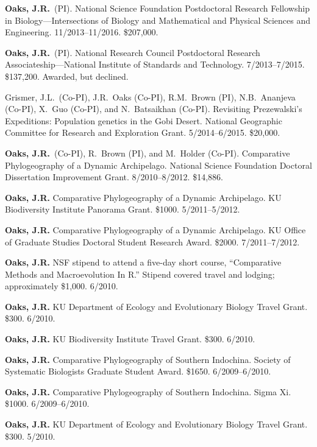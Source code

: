 \myHangIndent
\textbf{Oaks, J.R.}\ (PI).
National Science Foundation Postdoctoral Research Fellowship in
Biology---Intersections of Biology and Mathematical and Physical Sciences and
Engineering.
11/2013--11/2016.
\$207,000.

\myHangIndent
\textbf{Oaks, J.R.}\ (PI).
National Research Council Postdoctoral Research Associateship---National
Institute of Standards and Technology.
7/2013--7/2015.
\$137,200.
Awarded, but declined.

\myHangIndent
Grismer, J.L.\ (Co-PI), J.R.\ Oaks (Co-PI), R.M.\ Brown (PI), N.B.\ Ananjeva
(Co-PI), X.\ Guo (Co-PI), and N.\ Batsaikhan (Co-PI).
Revisiting Prezewalski's Expeditions: Population genetics in the Gobi Desert.
National Geographic Committee for Research and Exploration Grant.
5/2014--6/2015.
\$20,000.

\myHangIndent
\textbf{Oaks, J.R.}\ (Co-PI), R.\ Brown (PI), and M.\ Holder (Co-PI).
Comparative Phylogeography of a Dynamic Archipelago.
National Science Foundation Doctoral Dissertation Improvement Grant.
8/2010--8/2012.
\$14,886.

\myHangIndent
\textbf{Oaks, J.R.}
Comparative Phylogeography of a Dynamic Archipelago.
KU Biodiversity Institute Panorama Grant.
\$1000.
5/2011--5/2012.

\myHangIndent
\textbf{Oaks, J.R.}
Comparative Phylogeography of a Dynamic Archipelago.
KU Office of Graduate Studies Doctoral Student Research Award.
\$2000.
7/2011--7/2012.

\myHangIndent
\textbf{Oaks, J.R.}
NSF stipend to attend a five-day short course, ``Comparative Methods and
Macroevolution In R.''
Stipend covered travel and lodging; approximately \$1,000.
6/2010.

\myHangIndent
\textbf{Oaks, J.R.}
KU Department of Ecology and Evolutionary Biology Travel Grant.
\$300.
6/2010.

\myHangIndent
\textbf{Oaks, J.R.}
KU Biodiversity Institute Travel Grant.
\$300.
6/2010.

\myHangIndent
\textbf{Oaks, J.R.}
Comparative Phylogeography of Southern Indochina.
Society of Systematic Biologists Graduate Student Award.
\$1650.
6/2009--6/2010.

\myHangIndent
\textbf{Oaks, J.R.}
Comparative Phylogeography of Southern Indochina.
Sigma Xi.
\$1000.
6/2009--6/2010.

\myHangIndent
\textbf{Oaks, J.R.}
KU Department of Ecology and Evolutionary Biology Travel Grant.
\$300.
5/2010.

